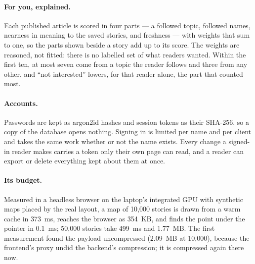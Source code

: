 \paragraph{For you, explained.} Each published article is scored in
four parts --- a followed topic, followed names, nearness in meaning to
the saved stories, and freshness --- with weights that sum to one, so
the parts shown beside a story add up to its score. The weights are
reasoned, not fitted: there is no labelled set of what readers wanted.
Within the first ten, at most seven come from a topic the reader
follows and three from any other, and ``not interested'' lowers, for
that reader alone, the part that counted most.

\paragraph{Accounts.} Passwords are kept as argon2id hashes and session
tokens as their SHA-256, so a copy of the database opens nothing.
Signing in is limited per name and per client and takes the same work
whether or not the name exists. Every change a signed-in reader makes
carries a token only their own page can read, and a reader can export
or delete everything kept about them at once.

\paragraph{Its budget.} Measured in a headless browser on the laptop's
integrated GPU with synthetic maps placed by the real layout, a map of
10,000 stories is drawn from a warm cache in 373~ms, reaches the browser
as 354~KB, and finds the point under the pointer in 0.1~ms; 50,000
stories take 499~ms and 1.77~MB. The first measurement found the
payload uncompressed (2.09~MB at 10,000), because the frontend's proxy
undid the backend's compression; it is compressed again there now.
